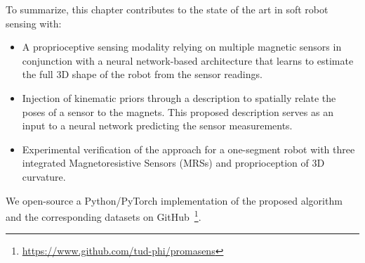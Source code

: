 To summarize, this chapter contributes to the state of the art in soft robot sensing with:
%
\begin{itemize}
    \item A proprioceptive sensing modality relying on multiple magnetic sensors in conjunction with a neural network-based architecture that learns to estimate the full 3D shape of the robot from the sensor readings. %
    \item Injection of kinematic priors through a description to spatially relate the poses of a sensor to the magnets. This proposed description serves as an input to a neural network predicting the sensor measurements. %
    \item Experimental verification of the approach for a one-segment robot with three integrated Magnetoresistive Sensors (MRSs) and proprioception of 3D curvature.    %
\end{itemize}
We open-source a Python/PyTorch implementation of the proposed algorithm and the corresponding datasets on GitHub~\footnote{\url{https://www.github.com/tud-phi/promasens}}.
